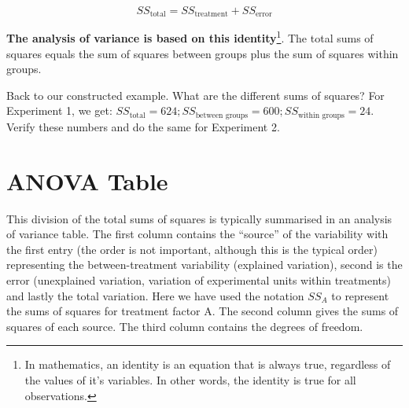 \documentclass[
  letterpaper,
]{book}
\begin{document}
\[
SS_{\text{total}} = SS_{\text{treatment}} + SS_{\text{error}}
\]

\textbf{The analysis of variance is based on this identity}\footnote{In
  mathematics, an identity is an equation that is always true,
  regardless of the values of it's variables. In other words, the
  identity is true for all observations.}. The total sums of squares
equals the sum of squares between groups plus the sum of squares within
groups.

Back to our constructed example. What are the different sums of squares?
For Experiment 1, we get:
\(SS_{\text{total}} = 624; SS_{\text{between groups}} = 600; SS_{\text{within groups}} = 24\).
Verify these numbers and do the same for Experiment 2.

\section{ANOVA Table}\label{anova-table}

This division of the total sums of squares is typically summarised in an
analysis of variance table. The first column contains the ``source'' of
the variability with the first entry (the order is not important,
although this is the typical order) representing the between-treatment
variability (explained variation), second is the error (unexplained
variation, variation of experimental units within treatments) and lastly
the total variation. Here we have used the notation \(SS_A\) to
represent the sums of squares for treatment factor A. The second column
gives the sums of squares of each source. The third column contains the
degrees of freedom.
\end{document}
